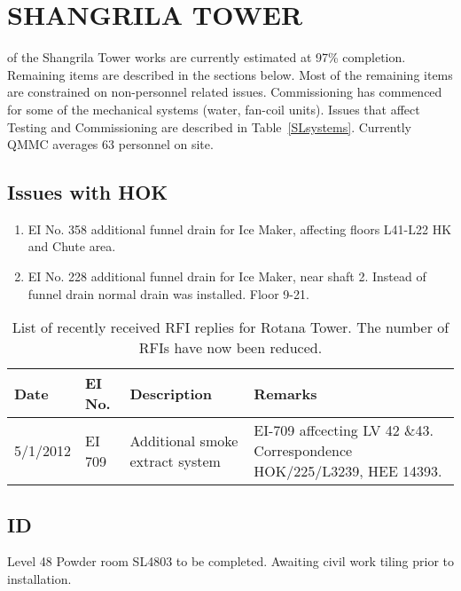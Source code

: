 \chapter{SHANGRILA TOWER}

 of the Shangrila Tower works are currently estimated at 97\% completion. Remaining items are described in the sections below.  Most of the remaining items  are constrained on non-personnel related issues. Commissioning has commenced for some of the mechanical systems (water, fan-coil units). Issues that affect Testing and Commissioning are described in Table~\ref{SLsystems}. Currently QMMC averages 63 personnel on site. 

\section{Issues with HOK}

\begin{enumerate}
\item EI No. 358 additional funnel drain for Ice Maker, affecting floors L41-L22 HK and Chute area.
\item EI No. 228 additional funnel drain for Ice Maker, near shaft 2. Instead of funnel drain normal drain was installed. Floor 9-21.
\end{enumerate}


\begin{table}[htbp]
\small\RaggedRight
\begin{tabular}{@{}llp{3cm}p{3cm}}
\toprule
Date &EI No. &Description &Remarks\\
\midrule
5/1/2012 &EI 709  &Additional smoke extract system &EI-709 affcecting LV 42 \&43. Correspondence HOK/225/L3239, HEE 14393.\\
\bottomrule
\end{tabular}
\caption{List of recently received RFI replies for Rotana Tower. The number of RFIs have now been reduced.}
\end{table}
\section{ID}
Level 48 Powder room SL4803 to be completed. Awaiting civil work tiling prior to installation.


